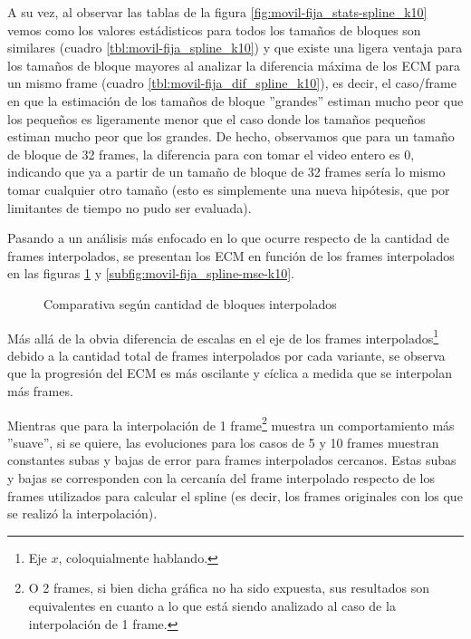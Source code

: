\par A su vez, al observar las tablas de la figura
\ref{fig:movil-fija_stats-spline_k10} vemos como los valores est\'adisticos
para todos los tama\~nos de bloques son similares (cuadro
\ref{tbl:movil-fija_spline_k10}) y que existe una ligera ventaja para los
tama\~nos de bloque mayores al analizar la diferencia m\'axima de los ECM para
un mismo frame (cuadro \ref{tbl:movil-fija_dif_spline_k10}), es decir, el
caso/frame en que la estimaci\'on de los tama\~nos de bloque ''grandes''
estiman mucho peor que los peque\~nos es ligeramente menor que el caso donde
los tama\~nos peque\~nos estiman mucho peor que los grandes. De hecho,
observamos que para un tama\~no de bloque de 32 frames, la diferencia para con
tomar el video entero es 0, indicando que ya a partir de un tama\~no de bloque
de 32 frames ser\'ia lo mismo tomar cualquier otro tama\~no (esto es
simplemente una nueva hip\'otesis, que por limitantes de tiempo no pudo ser
evaluada).

\par Pasando a un an\'alisis m\'as enfocado en lo que ocurre respecto de la
cantidad de frames interpolados, se presentan los ECM en funci\'on de los frames
interpolados en las figuras \ref{fig:movil-fija_spline-frames-interpolados} y
\ref{subfig:movil-fija_spline-mse-k10}.

\begin{figure}[H]
    \centering
    \caption{Comparativa seg\'un cantidad de bloques interpolados}
    \label{fig:movil-fija_spline-frames-interpolados}
\end{figure}

\par M\'as all\'a de la obvia diferencia de escalas en el eje de los frames
interpolados\footnote{Eje $x$, coloquialmente hablando.} debido a la cantidad
total de frames interpolados por cada variante, se observa que la progresi\'on
del ECM es m\'as oscilante y c\'iclica a medida que se interpolan m\'as frames.

\par Mientras que para la interpolaci\'on de 1 frame\footnote{O 2 frames, si
bien dicha gr\'afica no ha sido expuesta, sus resultados son equivalentes en
cuanto a lo que est\'a siendo analizado al caso de la interpolaci\'on de 1
frame.} muestra un comportamiento m\'as ''suave'', si se quiere, las
evoluciones para los casos de 5 y 10 frames muestran constantes subas y bajas
de error para frames interpolados cercanos. Estas subas y bajas se corresponden
con la cercan\'ia del frame interpolado respecto de los frames utilizados para
calcular el spline (es decir, los frames originales con los que se realiz\'o la
interpolaci\'on).

